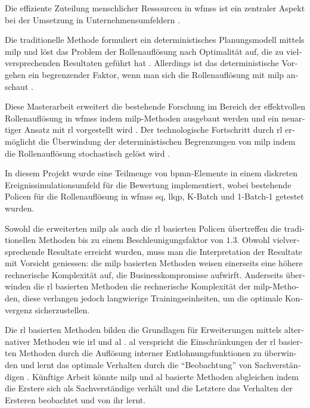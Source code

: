 \begin{otherlanguage}{ngerman}
	\begin{zusammenfassung}
	Die effiziente Zuteilung menschlicher Ressourcen in \glspl{wfms} ist ein zentraler Aspekt bei der Umsetzung in Unternehmensumfeldern \citep{Cheng2000,Mentzas2001}.

	Die traditionelle Methode formuliert ein deterministisches Planungsmodell mittels \gls{milp} und löst das Problem der Rollenauflösung nach Optimalität auf, die zu vielversprechenden Resultaten geführt hat \citep{Zeng2005}. Allerdings ist das deterministische Vorgehen ein begrenzender Faktor, wenn man sich die Rollenauflösung mit \gls{milp} anschaut \citep{Zeng2005}.

	Diese Masterarbeit erweitert die bestehende Forschung im Bereich der effektvollen Rollenauflösung in \glspl{wfms} indem \gls{milp}-Methoden ausgebaut werden und ein neuartiger Ansatz mit \gls{rl} vorgestellt wird \citep{Sutton2017}. Der technologische Fortschritt durch \gls{rl} ermöglicht die Überwindung der deterministischen Begrenzungen von \gls{milp} indem die Rollenauflösung stochastisch gelöst wird \citep{Sutton2017}.

	In diesem Projekt wurde eine Teilmenge von \gls{bpmn}-Elemente in einem diskreten Ereignissimulationsumfeld für die Bewertung implementiert, wobei bestehende Policen für die Rollenauflösung in \glspl{wfms} \zbg \gls{sq}, \gls{llqp}, K-Batch und 1-Batch-1 getestet wurden.

	Sowohl die erweiterten \gls{milp} als auch die \gls{rl} basierten Policen übertreffen die traditionellen Methoden bis zu einem Beschleunigungsfaktor von $1.3$. Obwohl vielversprechende Resultate erreicht wurden, muss man die Interpretation der Resultate mit Vorsicht geniessen: die \gls{milp} basierten Methoden weisen einerseits eine höhere rechnerische Komplexität auf, die Businesskompromisse aufwirft. Anderseits überwinden die \gls{rl} basierten Methoden die rechnerische Komplexität der \gls{milp}-Methoden, diese verlangen jedoch langwierige Trainingseinheiten, um die optimale Konvergenz sicherzustellen.

	Die \gls{rl} basierten Methoden bilden die Grundlagen für Erweiterungen mittels alternativer Methoden wie \zbg \gls{irl} \citep{Ng2000} und \gls{al} \citep{Abbeel2004}. \gls{al} verspricht die Einschränkungen der \gls{rl} basierten Methoden durch die Auflösung interner Entlohnungsfunktionen zu überwinden und lernt das optimale Verhalten durch die ``Beobachtung'' von Sachverständigen \citep{Abbeel2004}. Künftige Arbeit könnte \gls{milp} und \gls{al} basierte Methoden abgleichen indem die Erstere sich als Sachverständige verhält und die Letztere das Verhalten der Ersteren beobachtet und von ihr lernt.
	\end{zusammenfassung}
\end{otherlanguage}